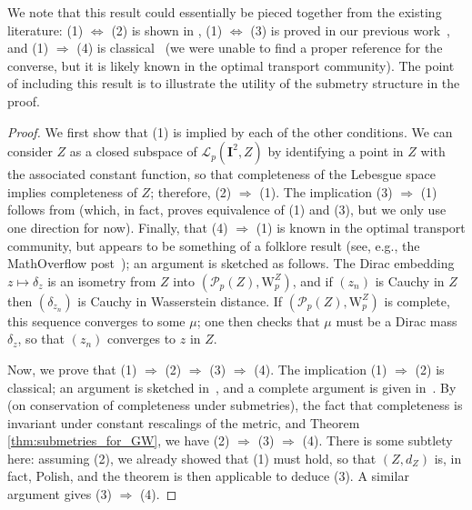 \documentclass{article}
\theoremstyle{definition}
\newcommand{\WZ}{\mathcal{P}_p(Z)}
\newcommand{\wz}{\mathrm{W}_p^Z}
\newcommand{\Lp}{\mathcal{L}_p}
\begin{document}
We note that this result could essentially be pieced together from the existing literature: (1) $\Leftrightarrow$ (2) is shown in \cite{serieys2025nonlinear}, (1) $\Leftrightarrow$ (3) is proved in our previous work~\cite{bauer2025zgromovwassersteindistance}, and (1) $\Rightarrow$ (4) is classical~\cite[Theorem 6.18]{villani2008optimal} (we were unable to find a proper reference for the converse, but it is likely known in the optimal transport community). The point of including this result is to illustrate the utility of the submetry structure in the proof.

\begin{proof}
    We first show that (1) is implied by each of the other conditions. We can consider $Z$ as a closed subspace of $\Lp(\mathbf{I}^2,Z)$ by identifying a point in $Z$ with the associated constant function, so that completeness of the Lebesgue space implies completeness of $Z$; therefore, (2) $\Rightarrow$ (1). The implication (3) $\Rightarrow$ (1) follows from \cite[Theorem 39]{bauer2025zgromovwassersteindistance} (which, in fact, proves equivalence of (1) and (3), but we only use one direction for now). Finally, that (4) $\Rightarrow$ (1) is known in the optimal transport community, but appears to be something of a folklore result (see, e.g., the MathOverflow post~\cite{CompletenessMathOverflow}); an  argument is sketched as follows. The Dirac embedding $z\mapsto \delta_z$ is an isometry from $Z$ into $(\WZ,\wz)$, and if $(z_n)$ is Cauchy in $Z$ then $(\delta_{z_n})$ is Cauchy in Wasserstein distance.
    If $(\WZ,\wz)$ is complete, this sequence converges to some $\mu$; one then checks that $\mu$ must be a Dirac mass $\delta_z$, so that $(z_n)$ converges to $z$ in $Z$.

    Now, we prove that (1) $\Rightarrow$ (2) $\Rightarrow$ (3) $\Rightarrow$ (4). The implication (1) $\Rightarrow$ (2) is classical; an argument is sketched in~\cite[Section 1.1]{korevaar1993sobolev}, and a complete argument is given in~\cite[Proposition 3.3]{sturm2001nonlinear}.
     By~\cite[Proposition 3.4]{alexander2024alexandrov} (on conservation of completeness under submetries), the fact that completeness is invariant under constant rescalings of the metric, and Theorem \ref{thm:submetries_for_GW}, we have (2) $\Rightarrow$ (3) $\Rightarrow$ (4). There is some subtlety here: assuming (2), we already showed that (1) must hold, so that $(Z,d_Z)$ is, in fact, Polish, and the theorem is then applicable to deduce (3). A similar argument gives (3) $\Rightarrow$ (4). 
    
\end{proof}
\end{document}
